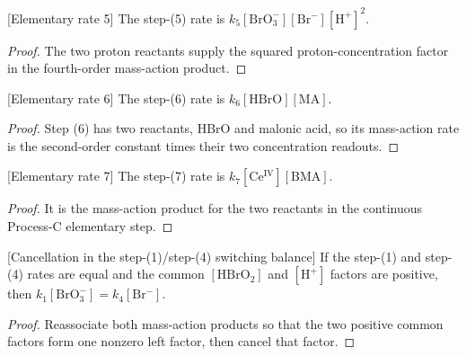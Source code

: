 \begin{definition}

[Elementary rate 5]
\label{def:chem:bz:rate5}
The step-(5) rate is
$k_5[\mathrm{BrO_3^-}][\mathrm{Br^-}][\mathrm{H^+}]^2$.
\end{definition}
\begin{proof}

The two proton reactants supply the squared proton-concentration factor in
the fourth-order mass-action product.
\end{proof}

\begin{definition}

[Elementary rate 6]
\label{def:chem:bz:rate6}
The step-(6) rate is
$k_6[\mathrm{HBrO}][\mathrm{MA}]$.
\end{definition}
\begin{proof}

Step (6) has two reactants, HBrO and malonic acid, so its mass-action rate is
the second-order constant times their two concentration readouts.
\end{proof}

\begin{definition}

[Elementary rate 7]
\label{def:chem:bz:rate7}
The step-(7) rate is $k_7[\mathrm{Ce^{IV}}][\mathrm{BMA}]$.
\end{definition}
\begin{proof}

It is the mass-action product for the two reactants in the continuous
Process-C elementary step.
\end{proof}

\begin{lemma}

[Cancellation in the step-(1)/step-(4) switching balance]
\label{lem:chem:bz:rate1_eq_rate4_of_positive}
If the step-(1) and step-(4) rates are equal and the common
$[\mathrm{HBrO_2}]$ and $[\mathrm{H^+}]$ factors are positive, then
$k_1[\mathrm{BrO_3^-}]=k_4[\mathrm{Br^-}]$.
\end{lemma}
\begin{proof}

Reassociate both mass-action products so that the two positive common factors
form one nonzero left factor, then cancel that factor.
\end{proof}

